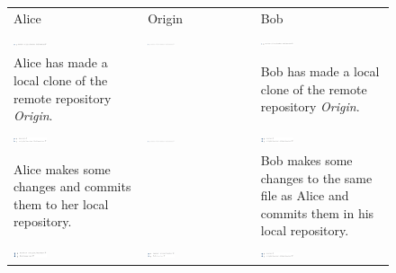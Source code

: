 \begin{figure}[htbp]
  \begin{tabulary}{\textwidth}{LLL}
    Alice & Origin & Bob\\
    \includegraphics[width=0.27\textwidth]{Figures/background/foxtrot/alice_1.png} &
    \includegraphics[width=0.27\textwidth]{Figures/background/foxtrot/remote_1.png} &
    \includegraphics[width=0.27\textwidth]{Figures/background/foxtrot/remote_1.png} \\

    \tiny{
    Alice has made a local clone of the remote repository
    \textit{Origin}.}
    &
    &
    \tiny{Bob has made a local clone of the remote repository
    \textit{Origin}.}
    \\

    \includegraphics[width=0.27\textwidth]{Figures/background/foxtrot/alice_2.png} &
    \includegraphics[width=0.27\textwidth]{Figures/background/foxtrot/remote_1.png} &
    \includegraphics[width=0.27\textwidth]{Figures/background/foxtrot/bob_2.png} \\

    \tiny{Alice makes some changes and commits them to her local repository.}

    &
    &
    \tiny{Bob makes some changes to the same file as Alice and commits them in
    his local repository.}
    \\

    \includegraphics[width=0.27\textwidth]{Figures/background/foxtrot/alice_3.png} &
    \includegraphics[width=0.27\textwidth]{Figures/background/foxtrot/remote_2.png} &
    \includegraphics[width=0.27\textwidth]{Figures/background/foxtrot/bob_2.png} \\


\end{tabulary}
\end{figure}
